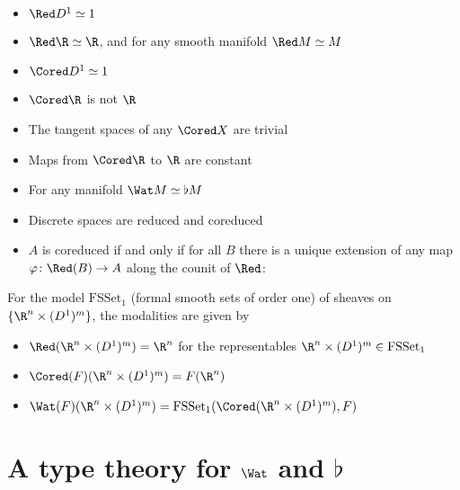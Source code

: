 \documentclass[a4paper,12pt]{article}
\begin{document}
\begin{itemize}
\item $\Red D^1 \simeq 1$
\item $\Red \R \simeq \R$, and for any smooth manifold $\Red M \simeq M$
\item $\Cored D^1 \simeq 1$
\item $\Cored \R$ is not $\R$
\item The tangent spaces of any $\Cored X$ are trivial
\item Maps from $\Cored \R$ to $\R$ are constant
\item For any manifold $\Wat M\simeq\flat M$
\item Discrete spaces are reduced and coreduced
\item $A$ is coreduced if and only if for all $B$ there is a unique extension of any map $\varphi\colon \Red(B)\to A$ along the counit of $\Red$:
\begin{center}
\end{center}
\end{itemize}
For the model $\mathrm{FSSet}_1$ (formal smooth sets of order one) of sheaves on $\{\R^n\times (D^1)^m \}$,
the modalities are given by
\begin{itemize}
\item $\Red(\R^n\times (D^1)^m)=\R^n$ for the representables $\R^n\times (D^1)^m\in\mathrm{FSSet}_1$
\item $\Cored(F)(\R^n\times (D^1)^m)=F(\R^n)$
\item $\Wat(F)(\R^n\times (D^1)^m)=\mathrm{FSSet}_1(\Cored(\R^n\times(D^1)^m), F)$
\end{itemize}

\newpage
\section{A type theory for $\Wat$ and $\flat$}
\end{document}
